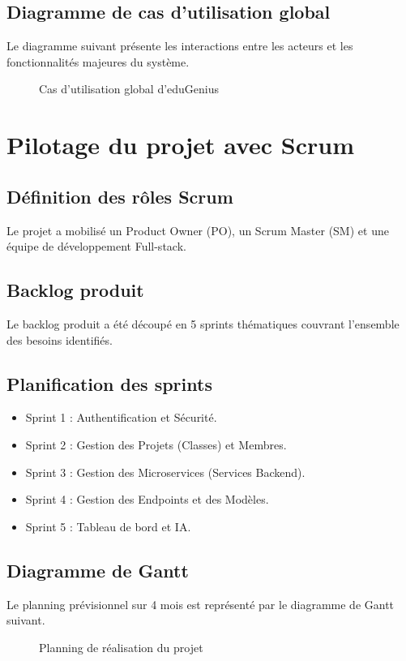 \subsection{Diagramme de cas d'utilisation global}
Le diagramme suivant présente les interactions entre les acteurs et les fonctionnalités majeures du système.
\begin{figure}[H]
    \centering
    \caption{Cas d'utilisation global d'eduGenius}
\end{figure}

\section{Pilotage du projet avec Scrum}
\subsection{Définition des rôles Scrum}
Le projet a mobilisé un Product Owner (PO), un Scrum Master (SM) et une équipe de développement Full-stack.

\subsection{Backlog produit}
Le backlog produit a été découpé en 5 sprints thématiques couvrant l'ensemble des besoins identifiés.

\subsection{Planification des sprints}
\begin{itemize}
    \item Sprint 1 : Authentification et Sécurité.
    \item Sprint 2 : Gestion des Projets (Classes) et Membres.
    \item Sprint 3 : Gestion des Microservices (Services Backend).
    \item Sprint 4 : Gestion des Endpoints et des Modèles.
    \item Sprint 5 : Tableau de bord et IA.
\end{itemize}

\subsection{Diagramme de Gantt}
Le planning prévisionnel sur 4 mois est représenté par le diagramme de Gantt suivant.
\begin{figure}[H]
    \centering
    \caption{Planning de réalisation du projet}
\end{figure}

